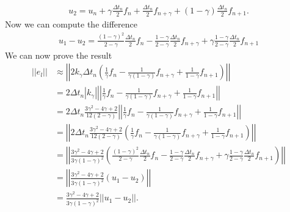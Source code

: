 \begin{questions}
\begin{solution}
\begin{align*}
u_2=u_n+\gamma\frac{\Delta t_n}{2}f_n+\frac{\Delta t_n}{2}f_{n+\gamma}+(1-\gamma)\frac{\Delta t_n}{2}f_{n+1}.
\end{align*}
Now we can compute the difference
\begin{align*}
u_1-u_2=\frac{(1-\gamma)^2}{2-\gamma}\frac{\Delta t_n}{2}f_n-\frac{1-\gamma}{2-\gamma}\frac{\Delta t_n}{2}f_{n+\gamma}+\gamma\frac{1-\gamma}{2-\gamma}\frac{\Delta t_n}{2}f_{n+1}
\end{align*}
We can now prove the result
\begin{align*}
||e_l||&\approx\left|\left|2k_{\gamma}\Delta t_n\left(\frac{1}{\gamma}f_n-\frac{1}{\gamma(1-\gamma)}f_{n+\gamma}+\frac{1}{1-\gamma}f_{n+1}\right)\right|\right|\\
&=2\Delta t_n|k_{\gamma}|\left|\left|\frac{1}{\gamma}f_n-\frac{1}{\gamma(1-\gamma)}f_{n+\gamma}+\frac{1}{1-\gamma}f_{n+1}\right|\right|\\
&=2\Delta t_n\frac{3\gamma^2-4\gamma+2}{12(2-\gamma)}\left|\left|\frac{1}{\gamma}f_n-\frac{1}{\gamma(1-\gamma)}f_{n+\gamma}+\frac{1}{1-\gamma}f_{n+1}\right|\right|\\
&=\left|\left|2\Delta t_n\frac{3\gamma^2-4\gamma+2}{12(2-\gamma)}\left(\frac{1}{\gamma}f_n-\frac{1}{\gamma(1-\gamma)}f_{n+\gamma}+\frac{1}{1-\gamma}f_{n+1}\right)\right|\right|\\
&=\left|\left|\frac{3 \gamma^2 - 4 \gamma +2}{3 \gamma (1 - \gamma)^2}\left(\frac{(1-\gamma)^2}{2-\gamma}\frac{\Delta t_n}{2}f_n-\frac{1-\gamma}{2-\gamma}\frac{\Delta t_n}{2}f_{n+\gamma}+\gamma\frac{1-\gamma}{2-\gamma}\frac{\Delta t_n}{2}f_{n+1}\right)\right|\right|\\
&=\left|\left|\frac{3 \gamma^2 - 4 \gamma +2}{3 \gamma (1 - \gamma)^2}\left(u_1-u_2\right)\right|\right|\\
&=\frac{3 \gamma^2 - 4 \gamma +2}{3 \gamma (1 - \gamma)^2}\left|\left|u_1-u_2\right|\right|.
\end{align*}
\end{solution}
\end{questions}
